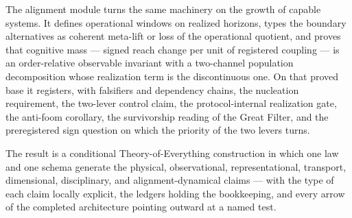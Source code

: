 \documentclass[11pt]{article}
\theoremstyle{definition}
\begin{document}
The alignment module turns the same machinery on the growth of capable systems. It defines operational windows on realized horizons, types the boundary alternatives as coherent meta-lift or loss of the operational quotient, and proves that cognitive mass --- signed reach change per unit of registered coupling --- is an order-relative observable invariant with a two-channel population decomposition whose realization term is the discontinuous one. On that proved base it registers, with falsifiers and dependency chains, the nucleation requirement, the two-lever control claim, the protocol-internal realization gate, the anti-foom corollary, the survivorship reading of the Great Filter, and the preregistered sign question on which the priority of the two levers turns.

The result is a conditional Theory-of-Everything construction in which one law and one schema generate the physical, observational, representational, transport, dimensional, disciplinary, and alignment-dynamical claims --- with the type of each claim locally explicit, the ledgers holding the bookkeeping, and every arrow of the completed architecture pointing outward at a named test.
\end{document}
